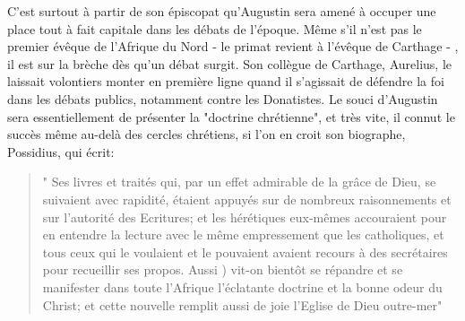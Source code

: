 C'est surtout à partir de son épiscopat qu'Augustin sera amené à occuper une place tout à fait capitale dans les débats de l'époque. Même s'il n'est pas le premier évêque de l'Afrique du Nord - le primat revient à l'évêque de Carthage - , il est sur la brèche dès qu'un débat surgit. Son collègue de Carthage, Aurelius, le laissait volontiers monter en première ligne quand il s'agissait de défendre la foi dans les débats publics, notamment contre les Donatistes. Le souci d'Augustin sera essentiellement de présenter la "doctrine chrétienne", et très vite, il connut le succès même au-delà des cercles chrétiens, si l'on en croit son biographe, Possidius, qui écrit:
\begin{quote}
    " Ses livres et traités qui, par un effet admirable de la grâce de Dieu, se suivaient avec rapidité, étaient appuyés sur de nombreux raisonnements et sur l'autorité des Ecritures; et les hérétiques eux-mêmes accouraient pour en entendre la
lecture avec le même empressement que les catholiques, et tous ceux qui le voulaient
et le pouvaient avaient recours à des secrétaires pour recueillir ses propos. Aussi	)
vit-on bientôt se répandre et se manifester dans toute l'Afrique l'éclatante doctrine et la bonne odeur du Christ; et cette nouvelle remplit aussi de joie l'Eglise de Dieu outre-mer" 
\end{quote}


